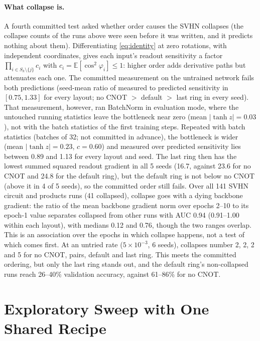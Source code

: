 \paragraph{What collapse is.} A fourth committed test asked whether order causes the SVHN collapses (the
collapse counts of the runs above were seen before it was written, and it predicts nothing about them).
Differentiating \cref{eq:identity} at zero rotations, with independent coordinates, gives each input's
readout sensitivity a factor $\prod_{i\in S_k\setminus\{j\}}c_i$ with $c_i=\mathbb{E}[\cos^2\varphi_i]\le1$:
higher order adds derivative paths but attenuates each one. The committed measurement on the untrained
network fails both predictions (seed-mean ratio of measured to predicted sensitivity in $[0.75,1.33]$ for every layout; no CNOT
$>$ default $>$ last ring in every seed). That measurement, however, ran BatchNorm in evaluation mode, where the
untouched running statistics leave the bottleneck near zero (mean $|\tanh z|=0.03$), not with the batch
statistics of the first training steps. Repeated with batch statistics (batches of 32; not committed in
advance), the bottleneck is wider (mean $|\tanh z|=0.23$, $c=0.60$) and measured over predicted
sensitivity lies between 0.89 and 1.13 for every layout and seed. The last ring then has the lowest summed
squared readout gradient in all 5 seeds (16.7, against 23.6 for no CNOT and 24.8 for the default ring),
but the default ring is not below no CNOT (above it in 4 of 5 seeds), so the committed order still fails.
Over all 141 SVHN circuit and products runs (41 collapsed), collapse goes with a dying backbone gradient:
the ratio of the mean backbone gradient norm over epochs 2--10 to its epoch-1 value separates collapsed
from other runs with AUC 0.94 (0.91--1.00 within each layout), with medians 0.12 and 0.76, though the
two ranges overlap. This is an association over the epochs in which collapse happens, not a test of
which comes first. At an untried rate ($5\times10^{-3}$, 6 seeds), collapses number 2, 2, 2 and 5 for
no CNOT, pairs, default and last ring. This meets the committed ordering, but only the last ring stands
out, and the default ring's non-collapsed runs reach 26--40\% validation accuracy, against 61--86\% for
no CNOT.



\section{Exploratory Sweep with One Shared Recipe}
\label{app:sweep}

